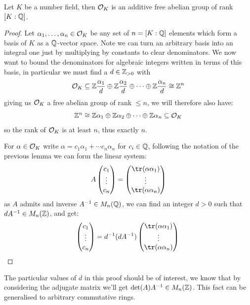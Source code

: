 \documentclass{article}
\begin{document}
\begin{theorem}
    Let $K$ be a number field, then $\mathcal{O}_K$ is an additive free abelian group of rank $[K:\mathbb{Q}]$.\begin{proof}
        Let $\alpha_1,\ldots,\alpha_n\in\mathcal{O}_K$ be any set of $n=[K:\mathbb{Q}]$ elements which form a basis of $K$ as a $\mathbb{Q}$-vector space. Note we can turn an arbitrary basis into an integral one just by multiplying by constants to clear denominators. We now want to bound the denominators for algebraic integers written in terms of this basis, in particular we must find a $d\in \mathbb{Z}_{>0}$ with \[
        \mathcal{O}_K \subseteq \mathbb{Z}\frac{\alpha_1}{d} \oplus \mathbb{Z}\frac{\alpha_2}{d} \oplus \cdots \oplus \mathbb{Z}\frac{\alpha_n}{d} \cong \mathbb{Z}^n
        \] giving us $\mathcal{O}_K$ a free abelian group of rank $\leq n$, we will therefore also have: \[
        \mathbb{Z}^n \cong \mathbb{Z}\alpha_1 \oplus \mathbb{Z}\alpha_2 \oplus \cdots \oplus \mathbb{Z}\alpha_n \subseteq \mathcal{O}_K
        \] so the rank of $\mathcal{O}_K$ is at least $n$, thus exactly $n$.

        For $\alpha\in \mathcal{O}_K$ write $\alpha = c_1\alpha_1 + \cdots c_n\alpha_n$ for $c_i\in\mathbb{Q}$, following the notation of the previous lemma we can form the linear system: \[
        A \begin{pmatrix}
            c_1\\
            \vdots\\
            c_n
        \end{pmatrix} = \begin{pmatrix}
            \tr(\alpha\alpha_1)\\
            \vdots\\
            \tr(\alpha\alpha_n)
        \end{pmatrix}
        \] as $A$ admits and inverse $A^{-1}\in M_n(\mathbb{Q})$, we can find an integer $d>0$ such that $dA^{-1}\in M_n(\mathbb{Z})$, and get: \[
        \begin{pmatrix}
            c_1\\
            \vdots\\
            c_n
        \end{pmatrix} = d^{-1}(dA^{-1})\begin{pmatrix}
            \tr(\alpha\alpha_1)\\
            \vdots\\
            \tr(\alpha\alpha_n)
        \end{pmatrix}\qedhere
        \]
    \end{proof}
\end{theorem}
The particular values of $d$ in this proof should be of interest, we know that by considering the adjugate matrix we'll get $\det(A)A^{-1}\in M_n(\mathbb{Z})$. This fact can be generalised to arbitrary commutative rings.
\end{document}
